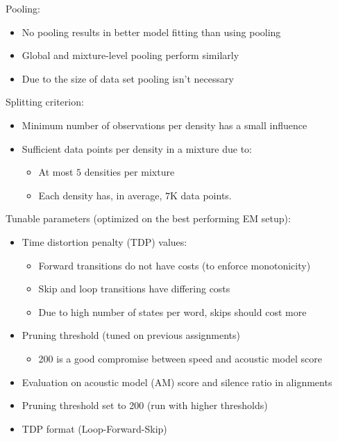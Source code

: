 \documentclass[11pt, a4paper, landscape]{article}
\begin{document}
\NewPage{}
\vfill
Pooling:
\begin{itemize}
	\item No pooling results in better model fitting than using pooling 
	\item Global and mixture-level pooling perform similarly 
	\item Due to the size of data set pooling isn't necessary
\end{itemize}
\vspace{20pt}
Splitting criterion:
\begin{itemize}
	\item Minimum number of observations per density has a small influence
	\item Sufficient data points per density in a mixture due to:
	\begin{itemize}
		\item At most $5$ densities per mixture
		\item Each density has, in average, $7$K data points.
	\end{itemize}
\end{itemize}
\vfill

\NewPage{}
\vfill
Tunable parameters (optimized on the best performing EM setup):
\begin{itemize}
	\item Time distortion penalty (TDP) values:
    \begin{itemize}
      \item Forward transitions do not have costs (to enforce monotonicity)
      \item Skip and loop transitions have differing costs
      \item Due to high number of states per word, skips should cost more
    \end{itemize}
	\item Pruning threshold (tuned on previous assignments)
	\begin{itemize}
		\item 200 is a good compromise between speed and acoustic model score
	\end{itemize}
\end{itemize}
\vfill

\NewPage{}
\vfill
\begin{itemize}
  \item Evaluation on acoustic model (AM) score and silence ratio in alignments
  \item Pruning threshold set to 200 (run with higher thresholds)
  \item TDP format (Loop-Forward-Skip) 
\end{itemize}
\end{document}
